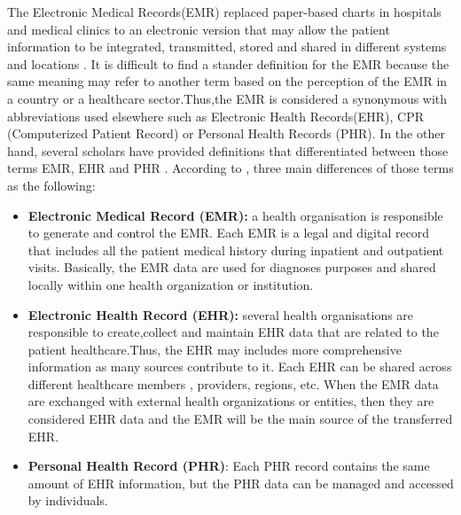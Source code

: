 The  Electronic Medical Records(EMR) replaced paper-based charts in hospitals and medical clinics to an electronic version that may allow the patient information to be integrated, transmitted, stored and shared in different systems and locations \cite{Rahim2016}. It is difficult to find a stander definition for the EMR because the same meaning may refer to another term based on the perception of the EMR in a country or a healthcare sector.Thus,the EMR is considered a synonymous with abbreviations used elsewhere such as  Electronic Health Records(EHR)\cite{WorldHealthOrganization2016,Rahim2016,}, CPR (Computerized Patient Record) or Personal Health Records (PHR). In the other hand, several scholars have provided definitions that differentiated between those terms EMR, EHR and PHR \cite{Kierkegaard2011,Deutsch2010} . According to \cite{Yang2015,U.S.DepartmentofHealthandHumanServices2015}, three main differences of those terms  as the following:
\begin{itemize}
	\item\textbf{ Electronic Medical Record (EMR):} a health organisation is responsible to generate and control the EMR. Each EMR is a legal and digital record that includes all the patient medical history  during inpatient and outpatient visits. Basically, the EMR data are used for diagnoses purposes and shared locally within one health organization or institution\cite{Yang2015}. 
	\item \textbf{Electronic Health Record (EHR):} several health organisations are responsible to create,collect and maintain EHR data that are related to the patient healthcare.Thus, the EHR  may includes more comprehensive information as many sources contribute to it. Each EHR can be shared across different healthcare members , providers, regions, etc. When the EMR data are exchanged with external health organizations or entities, then they are considered EHR data and the EMR will be the main source of the transferred EHR\cite{Yang2015}.  
	\item \textbf{Personal Health Record (PHR)}: Each PHR record contains the same amount of EHR information, but the PHR data can be managed and accessed by individuals\cite{Yang2015,U.S.DepartmentofHealthandHumanServices2015}.
\end{itemize}


%
%

